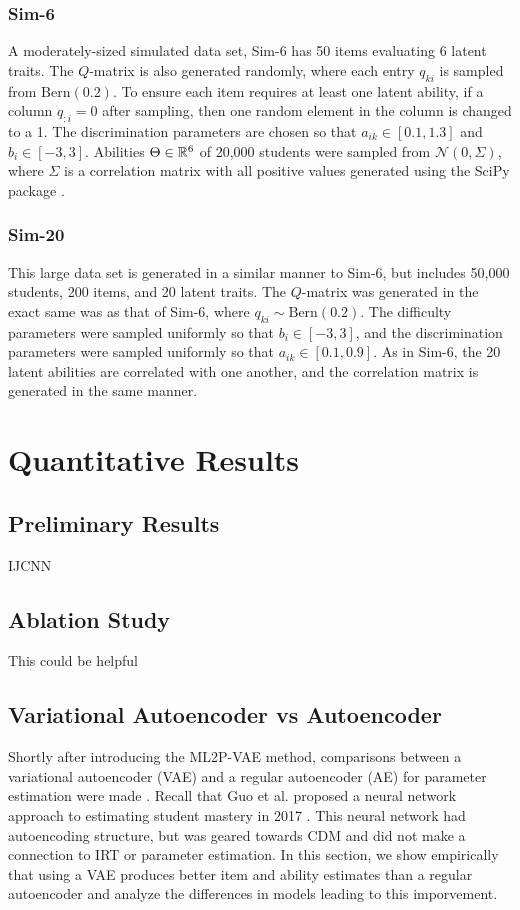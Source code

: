 \subsubsection*{Sim-6} A moderately-sized simulated data set, Sim-6 has 50 items evaluating 6 latent traits. The $Q$-matrix is also generated randomly, where each entry $q_{ki}$ is sampled from $\text{Bern}(0.2)$. To ensure each item requires at least one latent ability, if a column $q_{:i} = 0$ after sampling, then one random element in the column is changed to a 1. The discrimination parameters are chosen so that $a_{ik} \in [0.1, 1.3]$ and $b_i \in[-3,3]$. Abilities $\Theta \in \mathbb{R}^6$ of 20,000 students were sampled from $\mathcal{N}(0, \Sigma)$, where $\Sigma$ is a correlation matrix with all positive values generated using the SciPy package \cite{SciPy}.

\subsubsection*{Sim-20} This large data set is generated in a similar manner to Sim-6, but includes 50,000 students, 200 items, and 20 latent traits. The $Q$-matrix was generated in the exact same was as that of Sim-6, where $q_{ki} \sim \text{Bern}(0.2)$. The difficulty parameters were sampled uniformly so that $b_i \in [-3,3]$, and the discrimination parameters were sampled uniformly so that $a_{ik} \in [0.1, 0.9]$. As in Sim-6, the 20 latent abilities are correlated with one another, and the correlation matrix is generated in the same manner.

\section{Quantitative Results}

\subsection{Preliminary Results}\label{sec:prelim}
IJCNN

\subsection{Ablation Study}
This could be helpful

\subsection{Variational Autoencoder vs Autoencoder}
Shortly after introducing the ML2P-VAE method, comparisons between a variational autoencoder (VAE) and a regular autoencoder (AE) for parameter estimation were made \cite{aied_paper}. Recall that Guo et al. proposed a neural network approach to estimating student mastery in 2017 \cite{guo2017}. This neural network had autoencoding structure, but was geared towards CDM and did not make a connection to IRT or parameter estimation. In this section, we show empirically that using a VAE produces better item and ability estimates than a regular autoencoder and analyze the differences in models leading to this imporvement.

